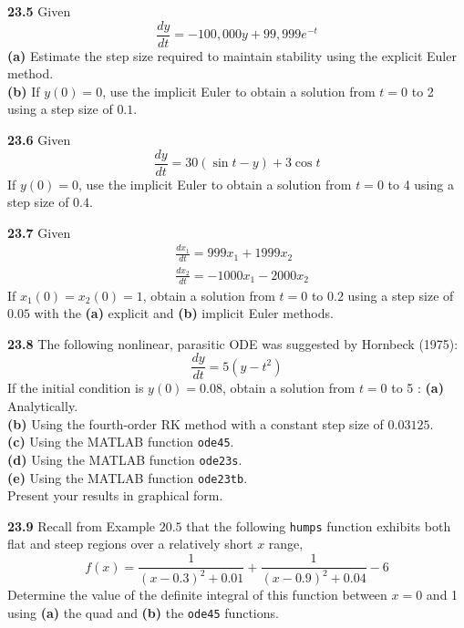 \documentclass[../main.tex]{subfiles}
\begin{document}
\noindent \textbf{23.5} Given
$$
\frac{d y}{d t}=-100,000 y+99,999 e^{-t}
$$
\textbf{(a)} Estimate the step size required to maintain stability using the explicit Euler method.\\
\textbf{(b)} If $y(0)=0$, use the implicit Euler to obtain a solution from $t=0$ to 2 using a step size of $0.1$.\vspace{2mm}

\noindent \textbf{23.6} Given
$$
\frac{d y}{d t}=30(\sin t-y)+3 \cos t
$$
If $y(0)=0$, use the implicit Euler to obtain a solution from $t=0$ to 4 using a step size of $0.4$.\vspace{2mm}

\noindent \textbf{23.7} Given
$$
\begin{aligned}
&\frac{d x_{1}}{d t}=999 x_{1}+1999 x_{2} \\
&\frac{d x_{2}}{d t}=-1000 x_{1}-2000 x_{2}
\end{aligned}
$$
If $x_{1}(0)=x_{2}(0)=1$, obtain a solution from $t=0$ to $0.2$ using a step size of $0.05$ with the \textbf{(a)} explicit and \textbf{(b)} implicit Euler methods.\vspace{2mm}

\noindent \textbf{23.8} The following nonlinear, parasitic ODE was suggested by Hornbeck (1975):
$$
\frac{d y}{d t}=5\left(y-t^{2}\right)
$$
If the initial condition is $y(0)=0.08$, obtain a solution from $t=0$ to 5 :
\textbf{(a)} Analytically.\\
\textbf{(b)} Using the fourth-order RK method with a constant step size of $0.03125$.\\
\textbf{(c)} Using the MATLAB function \texttt{ode45}.\\
\textbf{(d)} Using the MATLAB function \texttt{ode23s}.\\
\textbf{(e)} Using the MATLAB function \texttt{ode23tb}.\\
Present your results in graphical form.\vspace{2mm}

\noindent \textbf{23.9} Recall from Example $20.5$ that the following \texttt{humps} function exhibits both flat and steep regions over a relatively short $x$ range,
$$
f(x)=\frac{1}{(x-0.3)^{2}+0.01}+\frac{1}{(x-0.9)^{2}+0.04}-6
$$
Determine the value of the definite integral of this function between $x=0$ and 1 using \textbf{(a)} the quad and \textbf{(b)} the \texttt{ode45} functions.\vspace{2mm}
\end{document}
